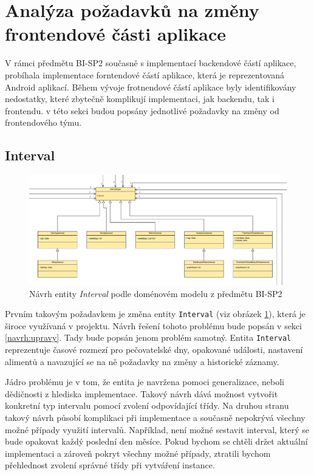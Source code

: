 \section{Analýza požadavků na změny frontendové části aplikace}\label{analyza:pozadavky-frontendu}
    V rámci předmětu BI-SP2 současně s implementací backendové částí aplikace, probíhala implementace forntendové částí aplikace, která je reprezentovaná Android aplikací. Během vývoje frotnendové částí aplikace byly identifikovány nedostatky, které zbytečně komplikují implementaci, jak backendu, tak i frontendu. v této sekci budou popsány jednotlivé požadavky na změny od frontendového týmu.
    
    \subsection{Interval}\label{analyza:pozadavky:interval}
        \begin{figure}\centering
	        \includegraphics[width=1.0\textwidth]{pdfs/Interval1}
	        \caption[Současný návrh entity \texttt{Interval}]{Návrh entity \textit{Interval} podle doménovém modelu z předmětu BI-SP2}\label{image:Interval1}
        \end{figure}
        Prvním takovým požadavkem je změna entity \verb|Interval| (viz obrázek \ref{image:Interval1}), která je široce využívaná v projektu. Návrh řešení tohoto problému bude popsán v sekci \ref{navrh:upravy}. Tady bude popsán jenom problém samotný. Entita \verb|Interval| reprezentuje časové rozmezí pro pečovatelské dny, opakované události, nastavení alimentů a navazující se na ně požadavky na změny a historické záznamy.
            
        Jádro problému je v tom, že entita je navržena pomoci generalizace, neboli dědičnosti z hlediska implementace. Takový návrh dává možnost vytvořit konkretní typ intervalu pomocí zvolení odpovídající třídy. Na druhou stranu takový návrh působí komplikaci při implementace a současně nepokrývá všechny možné případy využití intervalů. Například, není možné sestavit interval, který se bude opakovat každý poslední den měsíce. Pokud bychom se chtěli držet aktuální implementaci a zároveň pokryt všechny možné případy, ztratili bychom přehlednost zvolení správné třídy při vytváření instance.
            
